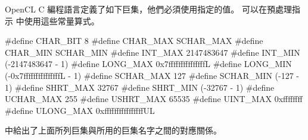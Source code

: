 {}

OpenCL C 編程語言定義了如下巨集，他們必須使用指定的值。
可以在預處理指示  中使用這些常量算式。

\startclc
#define CHAR_BIT	8
#define CHAR_MAX	SCHAR_MAX
#define CHAR_MIN	SCHAR_MIN
#define INT_MAX		2147483647
#define INT_MIN		(-2147483647 - 1)
#define LONG_MAX	0x7fffffffffffffffL
#define LONG_MIN	(-0x7fffffffffffffffL - 1)
#define SCHAR_MAX	127
#define SCHAR_MIN	(-127 - 1)
#define SHRT_MAX	32767
#define SHRT_MIN	(-32767 - 1)
#define UCHAR_MAX	255
#define USHRT_MAX	65535
#define UINT_MAX	0xffffffff
#define ULONG_MAX	0xffffffffffffffffUL
\stopclc

中給出了上面所列巨集與所用的巨集名字之間的對應關係。

{}

